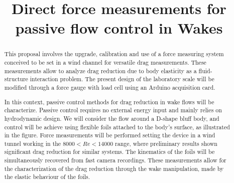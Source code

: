 \documentclass[english,12pt,a4paper]{article}
\begin{document}
	
	
	
	\title{Direct force measurements for passive flow control in Wakes}
	\date{}
	\maketitle
	\vspace{-1 cm}
	
	
	\begin{abstract}
		
		This proposal involves the upgrade, calibration and use of a force measuring system conceived to be set in a wind channel for versatile drag measurements. These measurements allow to analyze drag reduction due to body elasticity as a fluid-structure interaction problem. The present design of the laboratory scale will be modified through a force gauge with load cell using an Arduino acquisition card.
		
		In this context, passive control methods for drag reduction in wake flows will be characterize. Passive control requires no external energy input and mainly relies on  hydrodynamic design. We will consider the flow around a D-shape bluff body, and control will be achieve using flexible foils attached to the body's surface, as illustrated in the figure. Force measurements will be performed setting the device in a wind tunnel working in the $8000<Re<14000$ range, where preliminary results shown significant drag reduction for similar systems. The kinematics of the foils will be simultaneously recovered from fast camera recordings. These measurements allow for the characterization of the drag reduction through the wake manipulation, made by the elastic behaviour of the foils. 
		
		\begin{figure}[htb]
\centering\resizebox{.7\columnwidth}{!}{%
			
}
		\end{figure}
	\end{abstract}
	
\end{document}
